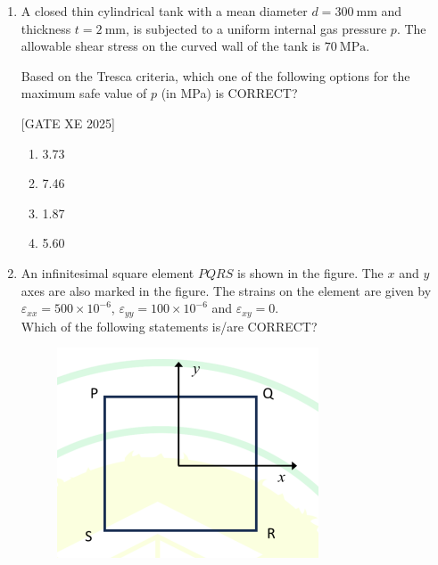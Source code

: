 \documentclass[journal,12pt,onecolumn]{IEEEtran}
\theoremstyle{remark}
\begin{document}
\begin{enumerate}
\hfill[GATE XE 2025]


\begin{multicols}{2}
\begin{enumerate}
\item $T_x=0$, $T_y=1000$ and $W_y=1000$
\item $T_x=0$, $T_y=1500$ and $W_y=500$
\item $T_x=0$, $T_y=800$ and $W_y=1200$
\item $T_x=0$, $T_y=500$ and $W_y=1500$
\end{enumerate}
\end{multicols}

\item A closed thin cylindrical tank with a mean diameter $d=300~\text{mm}$ and thickness $t=2~\text{mm}$, is subjected to a uniform internal gas pressure $p$. The allowable shear stress on the curved wall of the tank is $70~\text{MPa}$.

Based on the Tresca criteria, which one of the following options for the maximum safe value of $p$ (in MPa) is CORRECT?


\hfill[GATE XE 2025]


\begin{multicols}{2}
\begin{enumerate}
\item 3.73
\item 7.46
\item 1.87
\item 5.60
\end{enumerate}
\end{multicols}

\item An infinitesimal square element $PQRS$ is shown in the figure. The $x$ and $y$ axes are also marked in the figure. The strains on the element are given by \\ $\varepsilon_{xx}=500\times10^{-6}$, $\varepsilon_{yy}=100\times10^{-6}$ and $\varepsilon_{xy}=0$.\\

Which of the following statements is/are CORRECT?
\begin{figure}[H]
    \centering
    \includegraphics[width=0.5\columnwidth]{figs/fig23.png}
    \caption{}
    \label{fig:placeholder}
\end{figure}


\end{enumerate}
\end{document}
